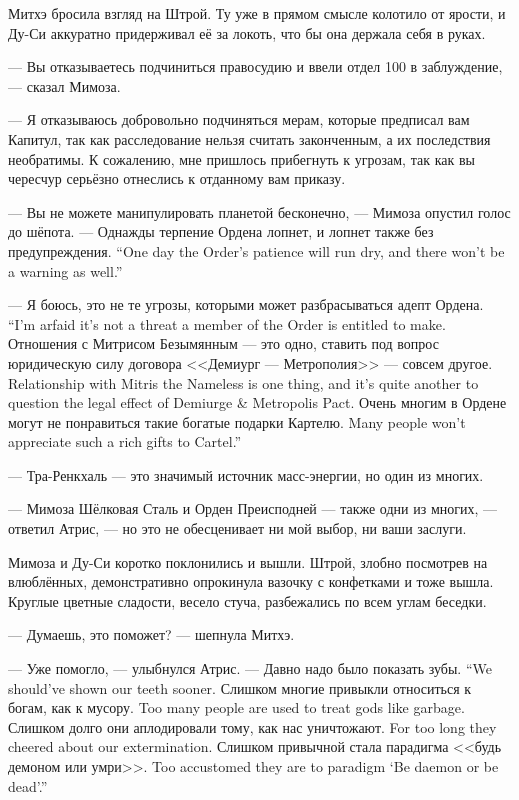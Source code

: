 Митхэ бросила взгляд на Штрой.
Ту уже в прямом смысле колотило от ярости, и Ду-Си аккуратно придерживал её за локоть, что бы она держала себя в руках.

--- Вы отказываетесь подчиниться правосудию и ввели отдел 100 в заблуждение, --- сказал Мимоза.

--- Я отказываюсь добровольно подчиняться мерам, которые предписал вам Капитул, так как расследование нельзя считать законченным, а их последствия необратимы.
К сожалению, мне пришлось прибегнуть к угрозам, так как вы чересчур серьёзно отнеслись к отданному вам приказу.

--- Вы не можете манипулировать планетой бесконечно, --- Мимоза опустил голос до шёпота.
{--- Однажды терпение Ордена лопнет, и лопнет также без предупреждения.}
{``One day the Order's patience will run dry, and there won't be a warning as well.''}

{--- Я боюсь, это не те угрозы, которыми может разбрасываться адепт Ордена.}
{``I'm arfaid it's not a threat a member of the Order is entitled to make.}
{Отношения с Митрисом Безымянным --- это одно, ставить под вопрос юридическую силу договора <<Демиург --- Метрополия>> --- совсем другое.}
{Relationship with Mitris the Nameless is one thing, and it's quite another to question the legal effect of Demiurge \& Metropolis Pact.}
{Очень многим в Ордене могут не понравиться такие богатые подарки Картелю.}
{Many people won't appreciate such a rich gifts to Cartel.''}

--- Тра-Ренкхаль --- это значимый источник масс-энергии, но один из многих.

--- Мимоза Шёлковая Сталь и Орден Преисподней --- также одни из многих, --- ответил Атрис, --- но это не обесценивает ни мой выбор, ни ваши заслуги.

Мимоза и Ду-Си коротко поклонились и вышли.
Штрой, злобно посмотрев на влюблённых, демонстративно опрокинула вазочку с конфетками и тоже вышла.
Круглые цветные сладости, весело стуча, разбежались по всем углам беседки.

--- Думаешь, это поможет? --- шепнула Митхэ.

--- Уже помогло, --- улыбнулся Атрис.
{--- Давно надо было показать зубы.}
{``We should've shown our teeth sooner.}
{Слишком многие привыкли относиться к богам, как к мусору.}
{Too many people are used to treat gods like garbage.}
{Слишком долго они аплодировали тому, как нас уничтожают.}
{For too long they cheered about our extermination.}
{Слишком привычной стала парадигма <<будь демоном или умри>>.}
{Too accustomed they are to paradigm `Be daemon or be dead'.''}

